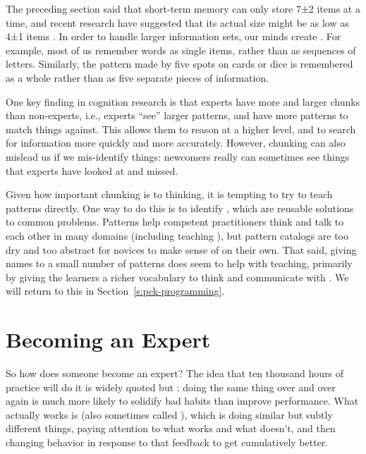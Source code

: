 The preceding section said that short-term memory can only store
7±2 items at a time, and recent research have suggested that its
actual size might be as low as 4±1 items \cite{Dida2016}. In
order to handle larger information sets, our minds create
. For example, most of us remember words
as single items, rather than as sequences of letters. Similarly, the
pattern made by five spots on cards or dice is remembered as a whole
rather than as five separate pieces of information.

One key finding in cognition research is that experts have more and
larger chunks than non-experts, i.e., experts ``see'' larger patterns, and
have more patterns to match things against. This allows them to reason
at a higher level, and to search for information more quickly and more
accurately. However, chunking can also mislead us if we mis-identify
things: newcomers really can sometimes see things that experts have
looked at and missed.

Given how important chunking is to thinking, it is tempting to try to
teach patterns directly. One way to do this is to identify , which are reusable solutions to common
problems. Patterns help competent practitioners think and talk to each
other in many domains (including teaching \cite{Berg2012}), but
pattern catalogs are too dry and too abstract for novices to make
sense of on their own. That said, giving names to a small number of
patterns does seem to help with teaching, primarily by giving the
learners a richer vocabulary to think and communicate with
\cite{Kuit2004,Byck2005,Saja2006}. We will
return to this in Section~\ref{s:pck-programming}.

\section{Becoming an Expert}\label{s:memory-becoming-expert}

So how does someone become an expert? The idea that ten thousand hours
of practice will do it is widely quoted but : doing the same thing over and over again is
much more likely to solidify bad habits than improve performance. What
actually works is  (also
sometimes called ), which
is doing similar but subtly different things, paying attention to what
works and what doesn't, and then changing behavior in response to that
feedback to get cumulatively better.

